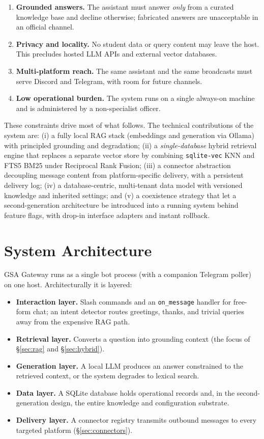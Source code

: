 \documentclass[11pt,letterpaper]{article}
\newcommand{\code}[1]{\texttt{\small #1}}
\begin{document}
\begin{enumerate}[leftmargin=1.4em,itemsep=2pt]
  \item \textbf{Grounded answers.} The assistant must answer \emph{only} from a
  curated knowledge base and decline otherwise; fabricated answers are unacceptable in
  an official channel.
  \item \textbf{Privacy and locality.} No student data or query content may leave the
  host. This precludes hosted LLM APIs and external vector databases.
  \item \textbf{Multi-platform reach.} The same assistant and the same broadcasts must
  serve Discord and Telegram, with room for future channels.
  \item \textbf{Low operational burden.} The system runs on a single always-on machine
  and is administered by a non-specialist officer.
\end{enumerate}

\noindent
These constraints drive most of what follows. The technical contributions of the
system are: (i) a fully local RAG stack (embeddings and generation via Ollama) with
principled grounding and degradation; (ii) a \emph{single-database} hybrid retrieval
engine that replaces a separate vector store by combining \code{sqlite-vec} KNN and
FTS5 BM25 under Reciprocal Rank Fusion; (iii) a connector abstraction decoupling
message content from platform-specific delivery, with a persistent delivery log;
(iv) a database-centric, multi-tenant data model with versioned knowledge and
inherited settings; and (v) a coexistence strategy that let a second-generation
architecture be introduced into a running system behind feature flags, with drop-in
interface adapters and instant rollback.

\section{System Architecture}

GSA Gateway runs as a single bot process (with a companion Telegram poller) on one
host. Architecturally it is layered:

\begin{itemize}[leftmargin=1.4em,itemsep=2pt]
  \item \textbf{Interaction layer.} Slash commands and an \code{on\_message} handler
  for free-form chat; an intent detector routes greetings, thanks, and trivial
  queries away from the expensive RAG path.
  \item \textbf{Retrieval layer.} Converts a question into grounding context (the
  focus of \S\ref{sec:rag} and \S\ref{sec:hybrid}).
  \item \textbf{Generation layer.} A local LLM produces an answer constrained to the
  retrieved context, or the system degrades to lexical search.
  \item \textbf{Data layer.} A SQLite database holds operational records and, in the
  second-generation design, the entire knowledge and configuration substrate.
  \item \textbf{Delivery layer.} A connector registry transmits outbound messages to
  every targeted platform (\S\ref{sec:connectors}).
\end{itemize}
\end{document}
